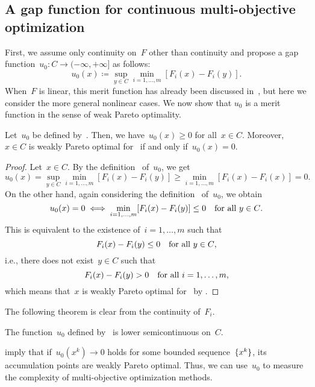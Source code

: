 \documentclass[../../main]{subfiles}
\begin{document}
\subsection{A gap function for continuous multi-objective optimization} 
First, we assume only continuity on~$F$ other than continuity and propose a gap function~$u_0 \colon C \to (-\infty, +\infty]$ as follows:
\begin{equation} \label{eq:gap_MO}
    u_0(x) \coloneqq \sup_{y \in C} \min_{i = 1, \dots, m} [ F_i(x) - F_i(y) ] 
.\end{equation}
When~$F$ is linear, this merit function has already been discussed in~\cite{Liu2009}, but here we consider the more general nonlinear cases.
We now show that $u_0$ is a merit function in the sense of weak Pareto optimality.
\begin{theorem} 
    Let~$u_0$ be defined by~.
    Then, we have~$u_0(x) \ge 0$ for all~$x \in C$.
    Moreover,~$x \in C$ is weakly Pareto optimal for~ if and only if~$u_0(x) = 0$.
\end{theorem}
\begin{proof}
    Let~$x \in C$.
    By the definition~ of~$u_0$, we get
    \begin{equation}
        u_0(x) = \sup_{y \in C} \min_{i = 1, \dots, m} [ F_i(x) - F_i(y) ]
                 \ge \min_{i = 1, \dots, m} [ F_i(x) - F_i(x) ] = 0
    .\end{equation} 
    On the other hand, again considering the definition~ of~$u_0$, we obtain
    \begin{equation}
        u_0(x) = 0 \iff \min_{i = 1, \dots, m} [ F_i(x) - F_i(y) ] \le 0 \quad \text{for all~$y \in C$}
    .\end{equation} 
    This is equivalent to the existence of~$i = 1, \dots, m$ such that
    \begin{equation}
        F_i(x) - F_i(y) \le 0 \quad \text{for all~$y \in C$}
    ,\end{equation} 
    i.e., there does not exist~$y \in C$ such that
    \begin{equation}
        F_i(x) - F_i(y) > 0 \quad \text{for all~$i = 1, \dots, m$}
    ,\end{equation} 
    which means that~$x$ is weakly Pareto optimal for~ by .
\end{proof}

The following theorem is clear from the continuity of~$F_i$.
\begin{theorem} 
    The function~$u_0$ defined by~ is lower semicontinuous on~$C$.
\end{theorem}
 imply that if~$u_0(x^k) \to 0$ holds for some bounded sequence~$\lbrace x^k\rbrace$, its accumulation points are weakly Pareto optimal.
Thus, we can use~$u_0$ to measure the complexity of multi-objective optimization methods.
\end{document}
